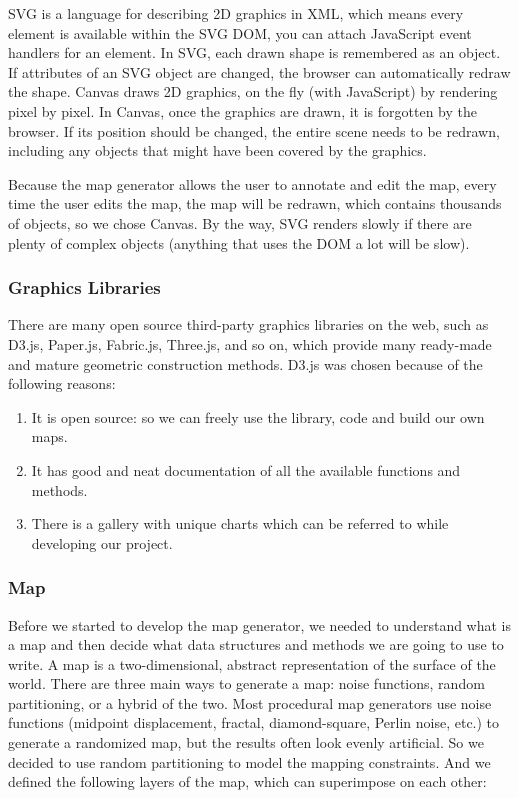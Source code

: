 SVG is a language for describing 2D graphics in XML, which means every element is available within the SVG DOM, you can attach JavaScript event handlers for an element. In SVG, each drawn shape is remembered as an object. If attributes of an SVG object are changed, the browser can automatically redraw the shape. Canvas draws 2D graphics, on the fly (with JavaScript) by rendering pixel by pixel. In Canvas, once the graphics are drawn, it is forgotten by the browser. If its position should be changed, the entire scene needs to be redrawn, including any objects that might have been covered by the graphics.

Because the map generator allows the user to annotate and edit the map, every time the user edits the map, the map will be redrawn, which contains thousands of objects, so we chose Canvas. By the way, SVG renders slowly if there are plenty of complex objects (anything that uses the DOM a lot will be slow).

\subsubsection{Graphics Libraries}
\label{sec:Design>Map Generator Design>Graphics Libraries}
There are many open source third-party graphics libraries on the web, such as D3.js, Paper.js, Fabric.js, Three.js, and so on, which provide many ready-made and mature geometric construction methods. D3.js was chosen because of the following reasons:
\begin{enumerate}
  \item It is open source: so we can freely use the library, code and build our own maps.
  \item It has good and neat documentation of all the available functions and methods.
  \item There is a gallery with unique charts which can be referred to while developing our project.
\end{enumerate}

\subsubsection{Map}
\label{sec:Design>Map Generator Design>Map}
Before we started to develop the map generator, we needed to understand what is a map and then decide what data structures and methods we are going to use to write. A map is a two-dimensional, abstract representation of the surface of the world. There are three main ways to generate a map: noise functions, random partitioning, or a hybrid of the two. Most procedural map generators use noise functions (midpoint displacement, fractal, diamond-square, Perlin noise, etc.) to generate a randomized map, but the results often look evenly artificial. So we decided to use random partitioning to model the mapping constraints. And we defined the following layers of the map, which can superimpose on each other:

